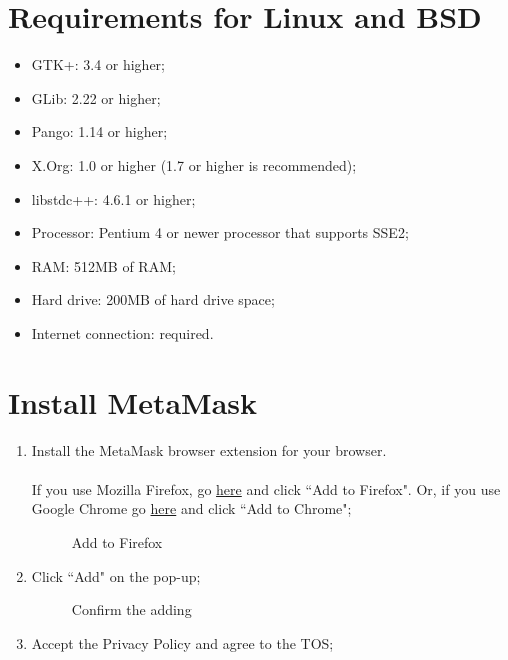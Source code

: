 \documentclass[ManualeUtente]{subfiles}
\begin{document}
\section{Requirements for Linux and BSD}
\begin{itemize}
	\item {GTK+:} 3.4 or higher;
	\item {GLib:} 2.22 or higher;
	\item {Pango:} 1.14 or higher;
	\item {X.Org:} 1.0 or higher (1.7 or higher is recommended);
	\item {libstdc++:} 4.6.1 or higher;
	\item {Processor:} Pentium 4 or newer processor that supports SSE2;
	\item {RAM:} 512MB of RAM;
	\item {Hard drive:} 200MB of hard drive space;
	\item {Internet connection:} required.
\end{itemize}


\section{Install MetaMask}
\begin{enumerate}
	\item Install the MetaMask browser extension for your browser.\\\\
	If you use Mozilla Firefox, go
	\href{https://addons.mozilla.org/en-US/firefox/addon/ether-metamask/}{here}
	and click \textquotedblleft Add to Firefox". Or, if you use Google Chrome go \href{https://chrome.google.com/webstore/detail/metamask/nkbihfbeogaeaoehlefnkodbefgpgknn}{here} and click \textquotedblleft Add to Chrome";
	\begin{figure}[H]
		\centering
		\caption{Add to Firefox}
		\label{fig:Add to Firefox}
	\end{figure}
	\item Click \textquotedblleft Add" on the pop-up;
	\begin{figure}[H]
		\centering
		\caption{Confirm the adding}
		\label{fig:Confirm the adding}
	\end{figure}
	\item Accept the Privacy Policy and agree to the TOS;
\end{enumerate}
\end{document}
